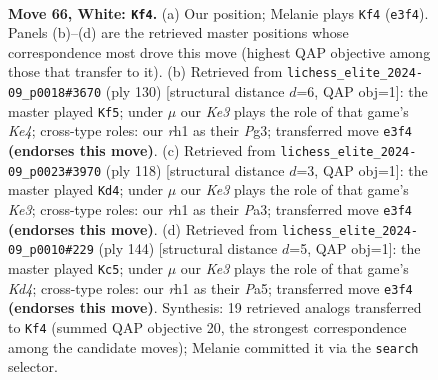 \documentclass[11pt]{article}
\begin{document}
\clearpage

\begin{figure}[p]\centering
\begin{subfigure}{0.46\textwidth}\centering
\resizebox{\linewidth}{!}{%
\newchessgame
\chessboard[
  setfen={8/8/2p2k2/p2p4/8/4K3/8/7r w - - 2 66},
  showmover=false,
  pgfstyle=straightmove, color=movearrow, markmove={e3-f4}
]}
\caption{}
\end{subfigure}\hfill
\begin{subfigure}{0.46\textwidth}\centering
\resizebox{\linewidth}{!}{%
\newchessgame
\chessboard[
  setfen={8/8/7p/6p1/4K3/2k3P1/8/8 w - - 2 66},
  showmover=false,
  pgfstyle=straightmove, color=movearrow, markmove={e4-f5}
]}
\caption{}
\end{subfigure}
\\[4pt]
\begin{subfigure}{0.46\textwidth}\centering
\resizebox{\linewidth}{!}{%
\newchessgame
\chessboard[
  setfen={8/p7/8/1p3k2/2p5/P3K3/8/8 w - - 3 60},
  showmover=false,
  pgfstyle=straightmove, color=movearrow, markmove={e3-d4}
]}
\caption{}
\end{subfigure}\hfill
\begin{subfigure}{0.46\textwidth}\centering
\resizebox{\linewidth}{!}{%
\newchessgame
\chessboard[
  setfen={8/8/p3k3/Pp6/3K4/8/8/8 w - - 2 73},
  showmover=false,
  pgfstyle=straightmove, color=movearrow, markmove={d4-c5}
]}
\caption{}
\end{subfigure}
\caption{\textbf{Move 66, White: \texttt{Kf4}.} (a) Our position; Melanie plays \texttt{Kf4} (\texttt{e3f4}). Panels (b)--(d) are the retrieved master positions whose correspondence most drove this move (highest QAP objective among those that transfer to it). (b) Retrieved from \texttt{lichess\_elite\_2024-09\_p0018\#3670} (ply 130) [structural distance $d$=6, QAP obj=1]: the master played \texttt{Kf5}; under $\mu$ our \emph{Ke3} plays the role of that game's \emph{Ke4}; cross-type roles: our \emph{r}h1 as their \emph{P}g3; transferred move \texttt{e3f4} \textbf{(endorses this move)}. (c) Retrieved from \texttt{lichess\_elite\_2024-09\_p0023\#3970} (ply 118) [structural distance $d$=3, QAP obj=1]: the master played \texttt{Kd4}; under $\mu$ our \emph{Ke3} plays the role of that game's \emph{Ke3}; cross-type roles: our \emph{r}h1 as their \emph{P}a3; transferred move \texttt{e3f4} \textbf{(endorses this move)}. (d) Retrieved from \texttt{lichess\_elite\_2024-09\_p0010\#229} (ply 144) [structural distance $d$=5, QAP obj=1]: the master played \texttt{Kc5}; under $\mu$ our \emph{Ke3} plays the role of that game's \emph{Kd4}; cross-type roles: our \emph{r}h1 as their \emph{P}a5; transferred move \texttt{e3f4} \textbf{(endorses this move)}. Synthesis: 19 retrieved analogs transferred to \texttt{Kf4} (summed QAP objective 20, the strongest correspondence among the candidate moves); Melanie committed it via the \texttt{search} selector.}
\label{fig:thought-m130}
\end{figure}
\end{document}
